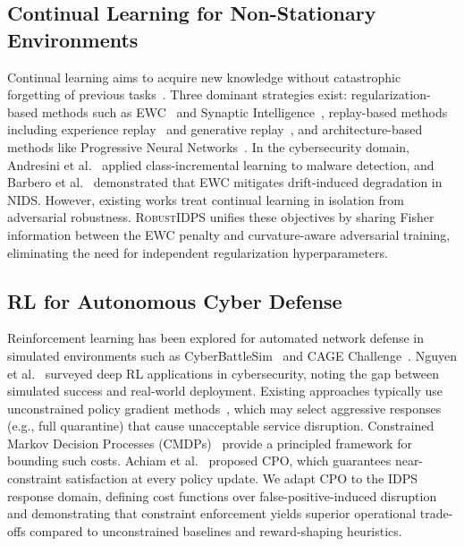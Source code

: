 \documentclass[journal,twoside]{IEEEtran}
\begin{document}
\subsection{Continual Learning for Non-Stationary Environments}
\label{sec:rw_cl}

Continual learning aims to acquire new knowledge without catastrophic
forgetting of previous tasks~\cite{delange2021continual}. Three dominant
strategies exist: regularization-based methods such as EWC~\cite{kirkpatrick2017overcoming}
and Synaptic Intelligence~\cite{zenke2017continual}, replay-based methods
including experience replay~\cite{rolnick2019experience} and generative
replay~\cite{shin2017continual}, and architecture-based methods like
Progressive Neural Networks~\cite{rusu2016progressive}. In the cybersecurity
domain, Andresini et al.~\cite{andresini2021insomnia} applied class-incremental
learning to malware detection, and Barbero et al.~\cite{barbero2022transcending}
demonstrated that EWC mitigates drift-induced degradation in NIDS. However,
existing works treat continual learning in isolation from adversarial robustness.
\textsc{RobustIDPS} unifies these objectives by sharing Fisher information
between the EWC penalty and curvature-aware adversarial training, eliminating
the need for independent regularization hyperparameters.

\subsection{RL for Autonomous Cyber Defense}
\label{sec:rw_rl}

Reinforcement learning has been explored for automated network defense in
simulated environments such as CyberBattleSim~\cite{msft2021cyberbattlesim}
and CAGE Challenge~\cite{cage2022}. Nguyen et al.~\cite{nguyen2021deep}
surveyed deep RL applications in cybersecurity, noting the gap between
simulated success and real-world deployment. Existing approaches typically use
unconstrained policy gradient methods~\cite{elderman2017adversarial,
foley2023autonomous}, which may select aggressive responses (e.g., full
quarantine) that cause unacceptable service disruption. Constrained Markov
Decision Processes (CMDPs)~\cite{altman1999constrained} provide a principled
framework for bounding such costs. Achiam et al.~\cite{achiam2017constrained}
proposed CPO, which guarantees near-constraint satisfaction at every policy
update. We adapt CPO to the IDPS response domain, defining cost functions over
false-positive-induced disruption and demonstrating that constraint enforcement
yields superior operational trade-offs compared to unconstrained baselines
and reward-shaping heuristics.
\end{document}
